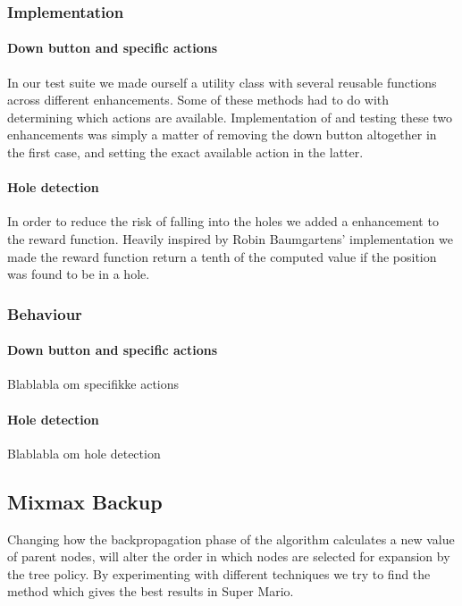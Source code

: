 \documentclass[10pt,a4paper]{article}
\begin{document}
\subsubsection{Implementation}

\paragraph{Down button and specific actions}
In our test suite we made ourself a utility class with several reusable functions across different enhancements. Some of these methods had to do with determining which actions are available. Implementation of and testing these two enhancements was simply a matter of removing the down button altogether in the first case, and setting the exact available action in the latter.


\paragraph{Hole detection}
In order to reduce the risk of falling into the holes we added a enhancement to the reward function. Heavily inspired by Robin Baumgartens' implementation we made the reward function return a tenth of the computed value if the position was found to be in a hole.

\subsubsection{Behaviour}

\paragraph{Down button and specific actions}
Blablabla om specifikke actions

\paragraph{Hole detection}
Blablabla om hole detection

\subsection{Mixmax Backup} %
Changing how the backpropagation phase of the algorithm calculates a new value of parent nodes, will alter the order in which nodes are selected for expansion by the tree policy. By experimenting with different techniques we try to find the method which gives the best results in Super Mario. %
\end{document}
